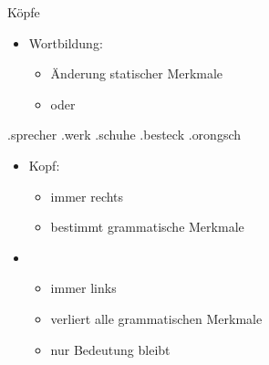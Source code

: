 \begin{frame}
  {Köpfe}
  \pause
  \begin{itemize}[<+->]
    \item Wortbildung:
      \begin{itemize}[<+->]
        \item Änderung statischer Merkmale
        \item oder 
      \end{itemize}
      \Viertelzeile
  \end{itemize}
  \pause
  \begin{exe}
    \ex
    \begin{xlist}
      \ex {}.\alert<8->{sprecher} 
      \pause
      \pause
      \pause
      \ex {}.\alert<11->{werk} 
      \pause
      \pause
      \pause
      \ex {}.\alert<14->{schuhe} 
      \pause
      \pause
      \pause
      \ex {}.\alert<17->{besteck} 
      \pause
      \pause
      \pause
      \ex {}.\alert<20->{orongsch} 
      \pause
      \pause
    \end{xlist}
  \end{exe}
  \pause
  \begin{itemize}[<+->]
    \item \alert{Kopf}:
      \begin{itemize}[<+->]
        \item immer rechts
        \item bestimmt grammatische Merkmale
      \end{itemize}
    \item {}
      \begin{itemize}[<+->]
        \item immer links
        \item verliert alle grammatischen Merkmale
        \item nur Bedeutung bleibt
      \end{itemize}
  \end{itemize}
\end{frame}


